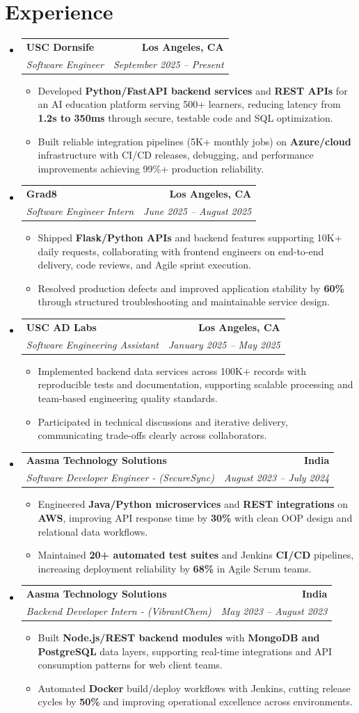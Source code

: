 \documentclass[letterpaper,10pt]{article}
\makeatletter
\newcommand{\resumeItem}[1]{\item\small{{#1 \vspace{-2pt}}}}
\newcommand{\resumeSubheading}[4]{\vspace{-1pt}\item\begin{tabular*}{1.0\textwidth}[t]{l@{\extracolsep{\fill}}r}\textbf{#1} & \textbf{\small #2} \\\textit{\small#3} & \textit{\small #4} \\\end{tabular*}\vspace{-2pt}}
\newcommand{\resumeSubHeadingListStart}{\begin{itemize}[leftmargin=0.0in, label={}]}
\newcommand{\resumeSubHeadingListEnd}{\end{itemize}}
\newcommand{\resumeItemListStart}{\begin{itemize}[leftmargin=0.15in,label=\textbullet,itemsep=2pt,topsep=0pt,parsep=0pt,partopsep=0pt]}
\newcommand{\resumeItemListEnd}{\end{itemize}\vspace{-4pt}}
\makeatother
\begin{document}
\section{Experience}
\resumeSubHeadingListStart
\resumeSubheading{USC Dornsife}{Los Angeles, CA}{Software Engineer}{September 2025 -- Present}
\resumeItemListStart
\resumeItem{Developed \textbf{Python/FastAPI backend services} and \textbf{REST APIs} for an AI education platform serving 500+ learners, reducing latency from \textbf{1.2s to 350ms} through secure, testable code and SQL optimization.}
\resumeItem{Built reliable integration pipelines (5K+ monthly jobs) on \textbf{Azure/cloud} infrastructure with CI/CD releases, debugging, and performance improvements achieving 99\%+ production reliability.}
\resumeItemListEnd
\resumeSubheading{Grad8}{Los Angeles, CA}{Software Engineer Intern}{June 2025 -- August 2025}
\resumeItemListStart
\resumeItem{Shipped \textbf{Flask/Python APIs} and backend features supporting 10K+ daily requests, collaborating with frontend engineers on end-to-end delivery, code reviews, and Agile sprint execution.}
\resumeItem{Resolved production defects and improved application stability by \textbf{60\%} through structured troubleshooting and maintainable service design.}
\resumeItemListEnd
\resumeSubheading{USC AD Labs}{Los Angeles, CA}{Software Engineering Assistant}{January 2025 -- May 2025}
\resumeItemListStart
\resumeItem{Implemented backend data services across 100K+ records with reproducible tests and documentation, supporting scalable processing and team-based engineering quality standards.}
\resumeItem{Participated in technical discussions and iterative delivery, communicating trade-offs clearly across collaborators.}
\resumeItemListEnd
\resumeSubheading{Aasma Technology Solutions}{India}{Software Developer Engineer - (SecureSync)}{August 2023 -- July 2024}
\resumeItemListStart
\resumeItem{Engineered \textbf{Java/Python microservices} and \textbf{REST integrations} on \textbf{AWS}, improving API response time by \textbf{30\%} with clean OOP design and relational data workflows.}
\resumeItem{Maintained \textbf{20+ automated test suites} and Jenkins \textbf{CI/CD} pipelines, increasing deployment reliability by \textbf{68\%} in Agile Scrum teams.}
\resumeItemListEnd
\resumeSubheading{Aasma Technology Solutions}{India}{Backend Developer Intern - (VibrantChem)}{May 2023 -- August 2023}
\resumeItemListStart
\resumeItem{Built \textbf{Node.js/REST backend modules} with \textbf{MongoDB and PostgreSQL} data layers, supporting real-time integrations and API consumption patterns for web client teams.}
\resumeItem{Automated \textbf{Docker} build/deploy workflows with Jenkins, cutting release cycles by \textbf{50\%} and improving operational excellence across environments.}
\resumeItemListEnd
\resumeSubHeadingListEnd
\vspace{-14pt}
\end{document}
